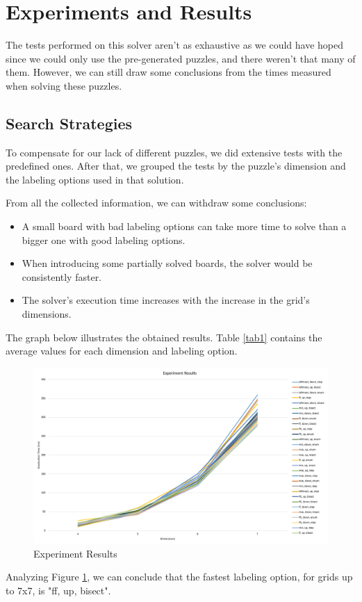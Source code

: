 \documentclass[runningheads]{llncs}
\begin{document}
\section{Experiments and Results}
The tests performed on this solver aren't as exhaustive as we could have hoped since
    we could only use the pre-generated puzzles, and there weren't that many of them.
However, we can still draw some conclusions from the times measured when solving these puzzles.

\subsection{Search Strategies}
To compensate for our lack of different puzzles, we did extensive tests with the predefined ones.
After that, we grouped the tests by the puzzle's dimension and the labeling options used in that solution.

From all the collected information, we can withdraw some conclusions:
\begin{itemize}
    \item A small board with bad labeling options can take more time to solve
            than a bigger one with good labeling options.
    \item When introducing some partially solved boards, the solver would be consistently faster.
    \item The solver's execution time increases with the increase in the grid's dimensions.
\end{itemize}

The graph below illustrates the obtained results.
Table \ref{tab1} contains the average values for each dimension and labeling option.

\begin{figure} [h]
    \centering
    \includegraphics[width=\textwidth]{img/execution_times.png}
    \caption{Experiment Results} \label{fig3}
\end{figure}
Analyzing Figure \ref{fig3}, we can conclude that the fastest labeling option,
    for grids up to 7x7, is "ff, up, bisect".
\end{document}
